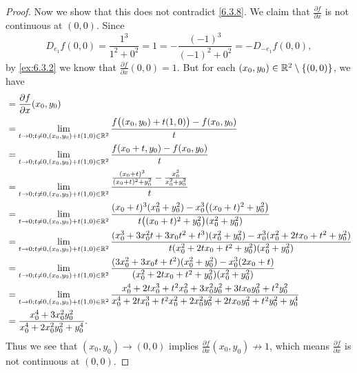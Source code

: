 \begin{proof}
  Now we show that this does not contradict \cref{6.3.8}.
  We claim that \(\frac{\partial f}{\partial x}\) is not continuous at \((0, 0)\).
  Since
  \[
    D_{e_1} f(0, 0) = \frac{1^3}{1^2 + 0^2} = 1 = -\frac{(-1)^3}{(-1)^2 + 0^2} = -D_{-e_1} f(0, 0),
  \]
  by \cref{ex:6.3.2} we know that \(\frac{\partial f}{\partial x}(0, 0) = 1\).
  But for each \((x_0, y_0) \in \mathbb{R}^2 \setminus \{(0, 0)\}\), we have
  \begin{align*}
     & = \frac{\partial f}{\partial x}(x_0, y_0)                                                                                                                                                                                      \\
     & = \lim_{t \to 0 ; t \neq 0, (x_0, y_0) + t(1, 0) \in \mathbb{R}^2} \frac{f\big((x_0, y_0) + t(1, 0)\big) - f(x_0, y_0)}{t}                                                                                                             \\
     & = \lim_{t \to 0 ; t \neq 0, (x_0, y_0) + t(1, 0) \in \mathbb{R}^2} \frac{f(x_0 + t, y_0) - f(x_0, y_0)}{t}                                                                                                                             \\
     & = \lim_{t \to 0 ; t \neq 0, (x_0, y_0) + t(1, 0) \in \mathbb{R}^2} \frac{\frac{(x_0 + t)^3}{(x_0 + t)^2 + y_0^2} - \frac{x_0^3}{x_0^2 + y_0^2}}{t}                                                                                     \\
     & = \lim_{t \to 0 ; t \neq 0, (x_0, y_0) + t(1, 0) \in \mathbb{R}^2} \frac{(x_0 + t)^3 (x_0^2 + y_0^2) - x_0^3 \big((x_0 + t)^2 + y_0^2\big)}{t \big((x_0 + t)^2 + y_0^2\big) (x_0^2 + y_0^2)}                                           \\
     & = \lim_{t \to 0 ; t \neq 0, (x_0, y_0) + t(1, 0) \in \mathbb{R}^2} \frac{(x_0^3 + 3 x_0^2 t + 3 x_0 t^2 + t^3) (x_0^2 + y_0^2) - x_0^3 (x_0^2 + 2 t x_0 + t^2 + y_0^2)}{t (x_0^2 + 2 t x_0 + t^2 + y_0^2) (x_0^2 + y_0^2)}             \\
     & = \lim_{t \to 0 ; t \neq 0, (x_0, y_0) + t(1, 0) \in \mathbb{R}^2} \frac{(3 x_0^2 + 3 x_0 t + t^2) (x_0^2 + y_0^2) - x_0^3 (2 x_0 + t)}{(x_0^2 + 2 t x_0 + t^2 + y_0^2) (x_0^2 + y_0^2)}                                               \\
     & = \lim_{t \to 0 ; t \neq 0, (x_0, y_0) + t(1, 0) \in \mathbb{R}^2} \frac{x_0^4 + 2 t x_0^3 + t^2 x_0^2 + 3 x_0^2 y_0^2 + 3 t x_0 y_0^2 + t^2 y_0^2}{x_0^4 + 2 t x_0^3 + t^2 x_0^2 + 2 x_0^2 y_0^2 + 2 t x_0 y_0^2 + t^2 y_0^2 + y_0^4} \\
     & = \frac{x_0^4 + 3 x_0^2 y_0^2}{x_0^4 + 2 x_0^2 y_0^2 + y_0^4}.
  \end{align*}
  Thus we see that \((x_0, y_0) \to (0, 0)\) implies \(\frac{\partial f}{\partial x}(x_0, y_0) \not\to 1\), which means \(\frac{\partial f}{\partial x}\) is not continuous at \((0, 0)\).
\end{proof}


